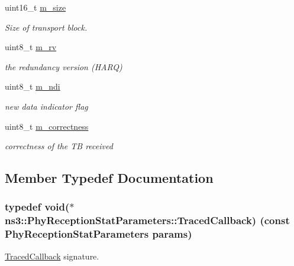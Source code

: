 \begin{DoxyCompactItemize}
uint16\+\_\+t \hyperlink{structns3_1_1PhyReceptionStatParameters_aefc0e5c7b0006dec1ca15a4eadf71eb4}{m\+\_\+size}
\begin{DoxyCompactList}\small\item\em Size of transport block. \end{DoxyCompactList}\item 
uint8\+\_\+t \hyperlink{structns3_1_1PhyReceptionStatParameters_a1b1f247cff7d15da79333f6c94e56d0b}{m\+\_\+rv}
\begin{DoxyCompactList}\small\item\em the redundancy version (H\+A\+RQ) \end{DoxyCompactList}\item 
uint8\+\_\+t \hyperlink{structns3_1_1PhyReceptionStatParameters_ab254f688b99a6acb6550dc1daee3acc2}{m\+\_\+ndi}
\begin{DoxyCompactList}\small\item\em new data indicator flag \end{DoxyCompactList}\item 
uint8\+\_\+t \hyperlink{structns3_1_1PhyReceptionStatParameters_a6657e7b9e0a31e63570a91a25e5ef0a1}{m\+\_\+correctness}
\begin{DoxyCompactList}\small\item\em correctness of the TB received \end{DoxyCompactList}\end{DoxyCompactItemize}


\subsection{Member Typedef Documentation}
\subsubsection[{\texorpdfstring{Traced\+Callback}{TracedCallback}}]{\setlength{\rightskip}{0pt plus 5cm}typedef void($\ast$  ns3\+::\+Phy\+Reception\+Stat\+Parameters\+::\+Traced\+Callback) (const {\bf Phy\+Reception\+Stat\+Parameters} params)}\hypertarget{structns3_1_1PhyReceptionStatParameters_a5d088f40469543164effe500ad341cd3}{}\label{structns3_1_1PhyReceptionStatParameters_a5d088f40469543164effe500ad341cd3}
\hyperlink{classns3_1_1TracedCallback}{Traced\+Callback} signature.


